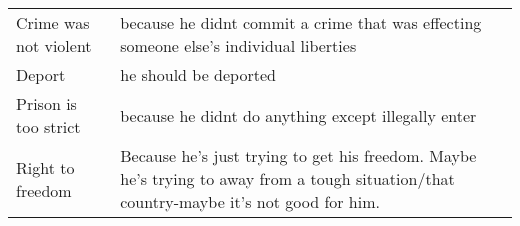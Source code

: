\documentclass[xcolor=dvipsnames]{beamer}
\begin{document}
\begin{frame}
\begin{table}[ht!]
\begin{tabular}{|p{1.5in}|p{2.75in}|}
Crime was not violent & because he didnt commit a crime that was effecting someone else's individual liberties                                                                                                                                                                                                                                                                                                                                                                                                                                                                                                                                                                    \\
Deport & he should be deported                                                                                                                                                                                                                                                                                                                                                                                                                                                                                                                                                                                                                                     \\
Prison is too strict & because he didnt do anything except illegally enter                                                                                                                                                                                                                                                                                                                                                                                                                                                                                                                                                                                                       \\
Right to freedom & Because he's just trying to get his freedom. Maybe he's trying to away from a tough situation/that country-maybe it's not good for him.                                                                                                                                                                                                                                                                                                                                                                                                                                                                                                                   \\

\end{tabular}
\end{table}
\end{frame}
\end{document}
